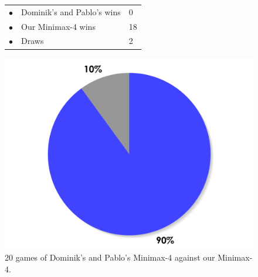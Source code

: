 \documentclass[paper=a4, fontsize=11pt]{article} %
\newcommand{\ra}[1]{\renewcommand{\arraystretch}{#1}}
\begin{document}
\begin{figure}[ht]
    \begin{minipage}[c]{0.40\linewidth}
        \centering
        \ra{1.3}
        \begin{tabular}{cll}
            \toprule
            \textcolor{red!100}{$\bullet$} & Dominik's and Pablo's wins & 0       \\
            \textcolor{blue!100!yellow!100!red!80}{$\bullet$} & Our Minimax-4  wins & 18      \\  
            \textcolor{gray!100}{$\bullet$} & Draws & 2      \\  
            \bottomrule
        \end{tabular}
    \end{minipage}
    \begin{minipage}[c]{0.60\linewidth}
        \centering
        \includegraphics[scale=0.35]{img/tournament.pdf}
    \end{minipage}
    \caption{20 games of Dominik's and Pablo's Minimax-4 against our Minimax-4.}
    \label{fig:tournament}
\end{figure}
\end{document}
